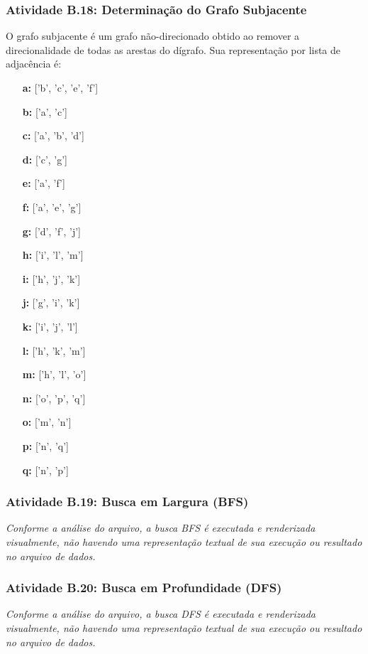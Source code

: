 \documentclass[a4paper,12pt]{article}
\begin{document}
\subsubsection*{Atividade B.18: Determinação do Grafo Subjacente}
O grafo subjacente é um grafo não-direcionado obtido ao remover a direcionalidade de todas as arestas do dígrafo. Sua representação por lista de adjacência é:
\begin{itemize}[leftmargin=*]
    \item[\textbf{a:}] ['b', 'c', 'e', 'f'] \item[\textbf{b:}] ['a', 'c'] \item[\textbf{c:}] ['a', 'b', 'd']
    \item[\textbf{d:}] ['c', 'g'] \item[\textbf{e:}] ['a', 'f'] \item[\textbf{f:}] ['a', 'e', 'g']
    \item[\textbf{g:}] ['d', 'f', 'j'] \item[\textbf{h:}] ['i', 'l', 'm'] \item[\textbf{i:}] ['h', 'j', 'k']
    \item[\textbf{j:}] ['g', 'i', 'k'] \item[\textbf{k:}] ['i', 'j', 'l'] \item[\textbf{l:}] ['h', 'k', 'm']
    \item[\textbf{m:}] ['h', 'l', 'o'] \item[\textbf{n:}] ['o', 'p', 'q'] \item[\textbf{o:}] ['m', 'n']
    \item[\textbf{p:}] ['n', 'q'] \item[\textbf{q:}] ['n', 'p']
\end{itemize}

\subsubsection*{Atividade B.19: Busca em Largura (BFS)}
\textit{Conforme a análise do arquivo, a busca BFS é executada e renderizada visualmente, não havendo uma representação textual de sua execução ou resultado no arquivo de dados.}

\subsubsection*{Atividade B.20: Busca em Profundidade (DFS)}
\textit{Conforme a análise do arquivo, a busca DFS é executada e renderizada visualmente, não havendo uma representação textual de sua execução ou resultado no arquivo de dados.}
\end{document}
